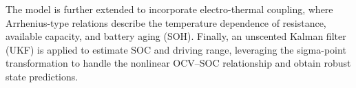 \documentclass{mcmthesis}
\begin{document}
The model is further extended to incorporate electro-thermal coupling, where Arrhenius-type relations describe the temperature dependence of resistance, available capacity, and battery aging (SOH). Finally, an unscented Kalman filter (UKF) is applied to estimate SOC and driving range, leveraging the sigma-point transformation to handle the nonlinear OCV–SOC relationship and obtain robust state predictions.
\newpage
{}

  





\end{document}
